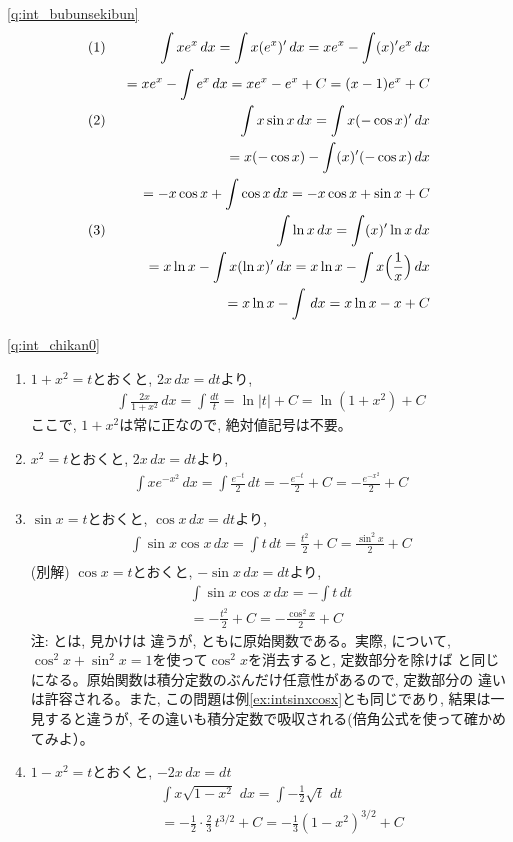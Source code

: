 \ref{q:int_bubunsekibun} 
\begin{eqnarray*}
(1)\,\,\,&&\int xe^x\,dx=\int x (e^x)'\, dx = xe^x-\int (x)' e^x\,dx\\
&&=xe^x-\int e^x\,dx = x e^x -e^x + C= (x-1)e^x+C\\
(2)\,\,\,&&\int x\sin x\,dx = \int x (-\cos x)' \,dx\\
&&=x(-\cos x)-\int (x)'(-\cos x)\,dx\\
&&=-x\cos x+\int \cos x\, dx = -x\cos x+\sin x + C\\
(3)\,\,\,&&\int\ln x\,dx=\int (x)'\ln x\, dx\\
&&=x\ln x - \int x(\ln x)'\,dx=x\ln x - \int x\Bigl(\frac{1}{x}\Bigr)\,dx\\
&&=x\ln x - \int \,dx = x\ln x - x + C
\end{eqnarray*}

\ref{q:int_chikan0}  
\begin{enumerate}
\item $1+x^2=t$とおくと, $2x\,dx=dt$より, 
\begin{eqnarray*}
\int\frac{2x}{1+x^2}\,dx=\int\frac{dt}{t}
=\ln |t|+C=\ln (1+x^2)+C
\end{eqnarray*}
ここで, $1+x^2$は常に正なので, 絶対値記号は不要。
\item $x^2=t$とおくと, $2x\,dx=dt$より, 
\begin{eqnarray*}
\int xe^{-x^2}\,dx=\int\frac{e^{-t}}{2}\,dt
=-\frac{e^{-t}}{2}+C=-\frac{e^{-x^2}}{2}+C
\end{eqnarray*}
\item $\sin x =t$とおくと, $\cos x\,dx=dt$より, 
\begin{eqnarray}
\int\sin x\cos x\,dx = \int t\,dt
=\frac{t^2}{2}+C=\frac{\sin^2 x}{2}+C\nonumber\\\label{eq:int_sinxcosx_ans1}
\end{eqnarray}
(別解)
$\cos x =t$とおくと, $-\sin x\,dx=dt$より, 
\begin{eqnarray}
\int\sin x\cos x\,dx = -\int t\,dt\nonumber\\
=-\frac{t^2}{2}+C=-\frac{\cos^2 x}{2}+C\label{eq:int_sinxcosx_ans2}
\end{eqnarray}
{\small 注: とは, 見かけは
違うが, ともに原始関数である。実際, について, 
$\cos^2x+\sin^2x=1$を使って$\cos^2x$を消去すると, 定数部分を除けば
と同じになる。原始関数は積分定数のぶんだけ任意性があるので, 定数部分の
違いは許容される。また, この問題は例\ref{ex:intsinxcosx}とも同じであり, 
結果は一見すると違うが, その違いも積分定数で吸収される(倍角公式を使って確かめてみよ）。}
\mv
\item $1-x^2=t$とおくと, $-2x\,dx=dt$
\begin{eqnarray*}
&&\int x\sqrt{1-x^2}\,\,dx=\int -\frac{1}{2}\sqrt{t}\,\,dt\\
&&=-\frac{1}{2}\cdotp\frac{2}{3}\,t^{3/2}+C=-\frac{1}{3}(1-x^2)^{3/2}+C
\end{eqnarray*}
\end{enumerate}
\hv

